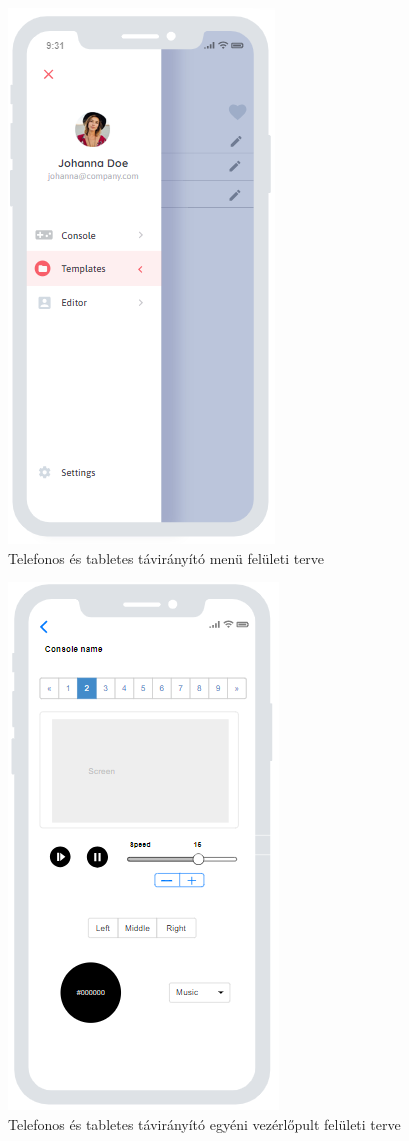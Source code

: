 \documentclass{article}
\begin{document}
\begin{figure}[H]
\centering
\includegraphics[height=1\linewidth]{Menu.png}
\caption{\label{fig:image}Telefonos és tabletes távirányító menü felületi terve}
\end{figure}

\begin{figure}[H]
\centering
\includegraphics[height=1\linewidth]{console.png}
\caption{\label{fig:image}Telefonos és tabletes távirányító egyéni vezérlőpult felületi terve}
\end{figure}
\end{document}
